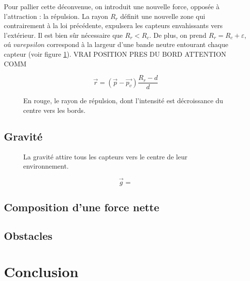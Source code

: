 \documentclass[10pt]{article}
\begin{document}
\begin{multicols}{2}
Pour pallier cette déconvenue, on introduit une nouvelle force,
opposée à l'attraction : la répulsion. La rayon $R_r$ définit une
nouvelle zone qui contrairement à la loi précédente, expulsera les
capteurs envahissants vers l'extérieur. Il est bien sûr nécessaire que
$R_r < R_c$. De plus, on prend $R_r = R_c + \varepsilon$, o\'u
$varepsilon$ correspond à la largeur d'une bande neutre entourant
chaque capteur (voir figure \ref{repulsion}).
VRAI POSITION PRES DU BORD
ATTENTION COMM

$$
\vec{r} = (\vec{p} - \vec{p_v}) \frac{R_r - d}{d}
$$


\begin{figure}[H]

  \centering

  

  \caption{En rouge, le rayon de répulsion, dont l'intensité est
    décroissance du centre vers les bords.}
  \label{repulsion}

\end{figure}

\subsection{Gravité}

\begin{figure}[H]

  \centering

  

  \caption{La gravité attire tous les capteurs vers le centre de leur
    environnement.}
  \label{gravite}

\end{figure}

$$
\vec{g} =
$$

\subsection{Composition d'une force nette}


\subsection{Obstacles}


\section{Conclusion}


\end{multicols}



\end{document}
